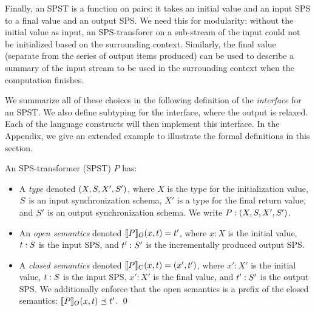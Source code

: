 Finally, an SPST is a function on pairs:
it takes an initial value and an input
SPS to a final value and an output SPS.
We need this for modularity: without the initial value as input, an SPS-transforer
on a sub-stream of the input could not be initialized based on the surrounding context.
Similarly, the final value (separate from the series of output items produced) can be
used to describe a summary of the input stream to be used in the surrounding context
when the computation finishes.


We summarize all of these choices in the following definition of the \emph{interface}
for an SPST.
We also define subtyping for the interface, where the output is relaxed.
Each of the language constructs will then implement this interface.
In the Appendix, we give an extended example
to illustrate the formal definitions in this section.

\begin{definition}
An SPS-transformer (SPST) $P$
has:
\begin{itemize}
\item A \emph{type} denoted $(X, \ss, X', \ss')$,
where
$X$ is the type for the initialization value,
$\ss$ is an input synchronization schema,
$X'$ is a type for the final return value,
and $\ss'$ is an output synchronization schema.
We write $P: (X, \ss, X', \ss')$.

\item An \emph{open semantics} denoted $\spstsemO{x}{t}{P} = t'$,
where $x: X$ is the initial value, $t: \ss$ is the input SPS,
and $t': \ss'$ is the incrementally produced output SPS.

\item A \emph{closed semantics} denoted $\spstsemC{x}{t}{P} = (x', t')$,
where $x': X'$ is the initial value, $t: \ss$ is the input SPS,
$x': X'$ is the final value, and $t': \ss'$ is the output SPS.
We additionally enforce that the open semantics is a prefix
of the closed semantics:
$\spstsemO{x}{t}{P} \prefix t'$.
\qed
\end{itemize}
\end{definition}

